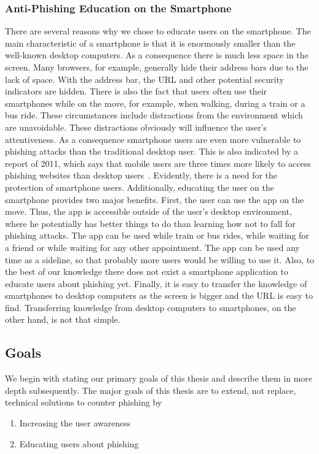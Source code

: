 \subsubsection{Anti-Phishing Education on the Smartphone}
There are several reasons why we chose to educate users on the smartphone. The main characteristic of a smartphone is that it is enormously smaller than the well-known desktop computers. As a consequence there is much less space in the screen. Many browsers, for example, generally hide their address bars due to the lack of space. With the address bar, the URL and other potential security indicators are hidden. There is also the fact that users often use their smartphones while on the move, for example, when walking, during a train or a bus ride. These circumstances include distractions from the environment which are unavoidable. These distractions obviously will influence the user's attentiveness. As a consequence smartphone users are even more vulnerable to phishing attacks than the traditional desktop user. This is also indicated by a report of 2011, which says that mobile users are three times more likely to access phishing websites than desktop users~\cite{trusteer2011}. Evidently, there is a need for the protection of smartphone users. Additionally, educating the user on the smartphone provides two major benefits. First, the user can use the app on the move. Thus, the app is accessible outside of the user's desktop environment, where he potentially has better things to do than learning how not to fall for phishing attacks. The app can be used while train or bus rides, while waiting for a friend or while waiting for any other appointment. The app can be used any time as a sideline, so that probably more users would be willing to use it. Also, to the best of our knowledge there does not exist a smartphone application to educate users about phishing yet. Finally, it is easy to transfer the knowledge of smartphones to desktop computers as the screen is bigger and the URL is easy to find. Transferring knowledge from desktop computers to smartphones, on the other hand, is not that simple.

\subsection{Goals}
\label{s:goals}
We begin with stating our primary goals of this thesis and describe them in more depth subsequently. The major goals of this thesis are to extend, not replace, technical solutions to counter phishing by
\begin{enumerate}
	\item Increasing the user awareness
	\item Educating users about phishing 
\end{enumerate}

